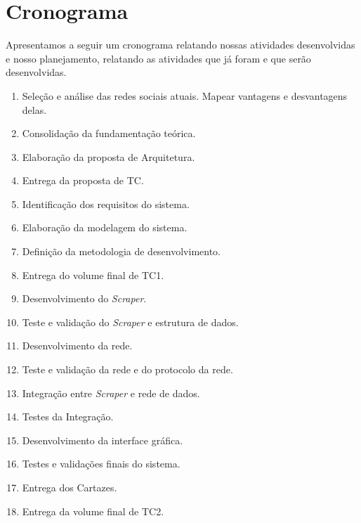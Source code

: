 \chapter{Cronograma}

Apresentamos a seguir um cronograma relatando nossas atividades desenvolvidas e nosso planejamento, relatando as atividades que já foram e que serão desenvolvidas.

\begin{enumerate}
    \item \label{cron:search} Seleção e análise das redes sociais atuais.
        \subitem Mapear vantagens e desvantagens delas.
    \item \label{cron:background} Consolidação da fundamentação teórica.
    \item \label{cron:architecture} Elaboração da proposta de Arquitetura.
    \item \label{cron:proposal} Entrega da proposta de TC.
    \item \label{cron:requirements} Identificação dos requisitos do sistema.
    \item \label{cron:diagrams} Elaboração da modelagem do sistema.
    \item \label{cron:methodology} Definição da metodologia de desenvolvimento.
    \item \label{cron:esc-tcI} Entrega do volume final de TC1.
    \item \label{cron:scraper} Desenvolvimento do \textit{Scraper}.
    \item \label{cron:val1}  Teste e validação do \textit{Scraper} e estrutura de dados.
    \item \label{cron:network} Desenvolvimento da rede.
    \item \label{cron:val2} Teste e validação da rede e do protocolo da rede.
    \item \label{cron:integration} Integração entre \textit{Scraper} e rede de dados.
    \item \label{cron:val3} Testes da Integração.
    \item \label{cron:gui} Desenvolvimento da interface gráfica.
    \item \label{cron:val4} Testes e validações finais do sistema.
    \item \label{cron:poster} Entrega dos Cartazes.
    \item \label{cron:esc-tcII} Entrega da volume final de TC2.
\end{enumerate}

